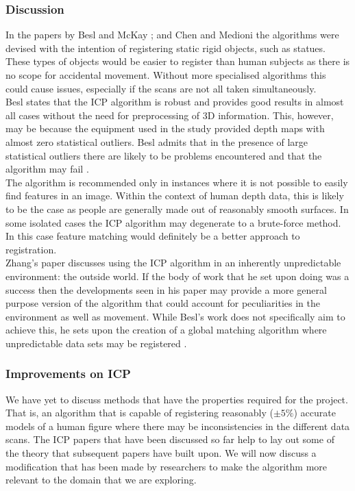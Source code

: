 \subsubsection{Discussion}
In the papers by Besl and McKay \cite{besl92}; and Chen and Medioni \cite{chen92} the algorithms were devised with the intention of registering static rigid objects, such as statues. These types of objects would be easier to register than human subjects as there is no scope for accidental movement. Without more specialised algorithms this could cause issues, especially if the scans are not all taken simultaneously. \\

Besl states that the ICP algorithm is robust and provides good results in almost all cases without the need for preprocessing of 3D information. This, however, may be because the equipment used in the study provided depth maps with almost zero statistical outliers. Besl admits that in the presence of large statistical outliers there are likely to be problems encountered and that the algorithm may fail \cite{besl92}. \\

The algorithm is recommended only in instances where it is not possible to easily find features in an image. Within the context of human depth data, this is likely to be the case as people are generally made out of reasonably smooth surfaces. In some isolated cases the ICP algorithm may degenerate to a brute-force method. In this case feature matching would definitely be a better approach to registration. \\

Zhang's \cite{zhang94} paper discusses using the ICP algorithm in an inherently unpredictable environment: the outside world. If the body of work that he set upon doing was a success then the developments seen in his paper may provide a more general purpose version of the algorithm that could account for peculiarities in the environment as well as movement. While Besl's work does not specifically aim to achieve this, he sets upon the creation of a global matching algorithm where unpredictable data sets may be registered \cite{besl92}.\\

\subsubsection{Improvements on ICP}
We have yet to discuss methods that have the properties required for the project. That is, an algorithm that is capable of registering reasonably ($\pm 5\%$) accurate models of a human figure where there may be inconsistencies in the different data scans. The ICP papers that have been discussed so far help to lay out some of the theory that subsequent papers have built upon. We will now discuss a modification that has been made by researchers to make the algorithm more relevant to the domain that we are exploring. \\

